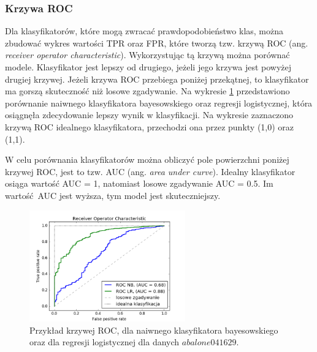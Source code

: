 \subsubsection{Krzywa ROC}
Dla klasyfikatorów, które mogą zwracać prawdopodobieństwo klas, można zbudować wykres wartości TPR oraz FPR, które tworzą tzw. krzywą ROC (ang. \textit{receiver operator characteristic}). Wykorzystując tą krzywą można porównać modele. Klasyfikator jest lepszy od drugiego, jeżeli jego krzywa jest powyżej drugiej krzywej. Jeżeli krzywa ROC przebiega poniżej przekątnej, to klasyfikator ma gorszą skuteczność niż losowe zgadywanie. Na wykresie \ref{fig:krzywa_roc} przedstawiono porównanie naiwnego klasyfikatora bayesowskiego oraz regresji logistycznej, która osiągnęła zdecydowanie lepszy wynik w klasyfikacji. Na wykresie zaznaczono krzywą ROC idealnego klasyfikatora, przechodzi ona przez punkty (1,0) oraz (1,1).\par
W celu porównania klasyfikatorów można obliczyć pole powierzchni poniżej krzywej ROC, jest to tzw. AUC (ang. \textit{area under curve}). Idealny klasyfikator osiąga wartość AUC = 1, natomiast losowe zgadywanie AUC = 0.5. Im wartość AUC jest wyższa, tym model jest skuteczniejszy.
\begin{figure}[h]
	\centering
	\includegraphics[width=0.6\textwidth]{./images/roc.png}
	\caption[Przykład krzywej ROC]{Przykład krzywej ROC, dla naiwnego klasyfikatora bayesowskiego oraz dla regresji logistycznej dla danych $abalone041629$.}
	\label{fig:krzywa_roc}
\end{figure}
\newpage

